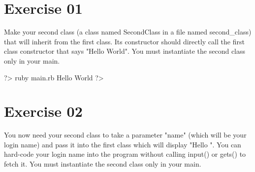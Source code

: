 \documentclass{42-en}
\begin{document}

\nextexercice
\chapter{Exercise 01}


\makeheaderfiles

Make your second class (a class named SecondClass in a file named second\_class) that will inherit from the first class. Its constructor should directly call the first class constructor that says "Hello World". You must instantiate the second class only in your main.

\begin{42console}
	?> ruby main.rb
	Hello World
	?>
\end{42console}

\nextexercice
\chapter{Exercise 02}


\makeheaderfiles

You now need your second class to take a parameter "name" (which will be your login name) and pass it into the first class which will display "Hello ". You can hard-code your login name into the program without calling input() or gets() to fetch it. You must instantiate the second class only in your main.
\end{document}
